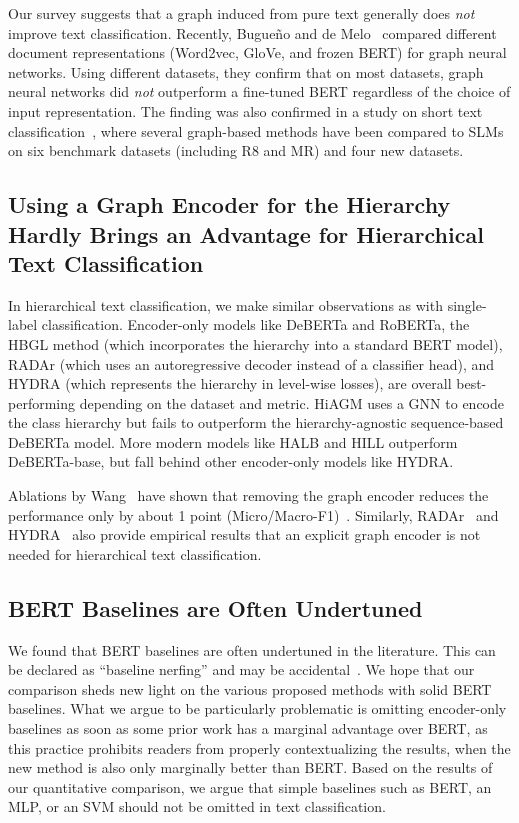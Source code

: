 \documentclass[lettersize,journal]{IEEEtran}
\newcommand{\SLMs}{SLMs\xspace}
\begin{document}
Our survey suggests that a graph induced from pure text generally
does \emph{not} improve text classification. 
Recently, Bugue\~{n}o and de Melo~\cite{buguenoConnectingDotsWhat2023} compared different document representations (Word2vec, GloVe, and frozen BERT) for graph neural networks.
Using different datasets, they confirm that on most datasets, graph neural networks did \emph{not} outperform a fine-tuned BERT regardless of the choice of input representation. 
The finding was also confirmed in a study on short text classification~\cite{DBLP:conf/cdmake/KarlS23},
where several graph-based methods have been compared to \SLMs on six benchmark datasets (including R8 and MR) and four new datasets.

\subsection{Using a Graph Encoder for the Hierarchy Hardly Brings an Advantage for Hierarchical Text Classification}

In hierarchical text classification, we make similar observations as with single-label classification. 
Encoder-only models like DeBERTa and RoBERTa, the HBGL method (which incorporates the hierarchy into a standard BERT model), RADAr (which uses an autoregressive decoder instead of a classifier head), and HYDRA (which represents the hierarchy in level-wise losses), are overall best-performing depending on the dataset and metric. 
HiAGM uses a GNN to encode the class hierarchy but fails to outperform the hierarchy-agnostic sequence-based DeBERTa model.
More modern models like HALB and HILL outperform DeBERTa-base, but fall behind other encoder-only models like HYDRA.

Ablations by
Wang~\etal\cite{DBLP:conf/acl/WangWH0W22} have shown that removing the graph encoder reduces the performance only by about 1 point
(Micro/Macro-F1)~\cite{DBLP:conf/acl/WangWH0W22}.  
Similarly, RADAr~\cite{radar} and HYDRA~\cite{hydra} also provide empirical results that an explicit graph encoder is not needed for hierarchical text classification.

\subsection{BERT Baselines are Often Undertuned}

We found that BERT baselines are often undertuned in the literature. This can be declared as ``baseline nerfing'' and may be accidental~\cite{leech2024questionablepracticesmachinelearning}. 
We hope that our comparison sheds new light on the various proposed methods with solid BERT baselines. What we argue to be particularly problematic is omitting encoder-only baselines as soon as some prior work has a marginal advantage over BERT, as this practice prohibits readers from properly contextualizing the results, \eg when the new method is also only marginally better than BERT. Based on the results of our quantitative comparison, we argue that simple baselines such as BERT, an MLP, or an SVM should not be omitted in text classification.
\end{document}
